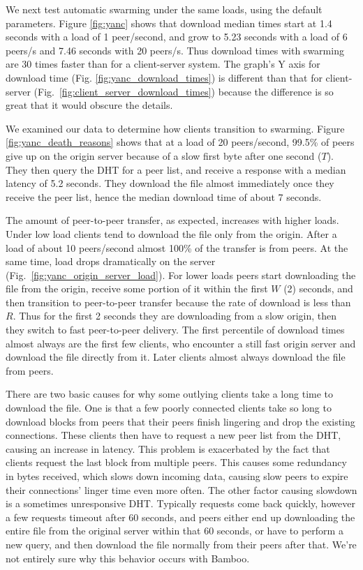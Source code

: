 We next test automatic swarming under the same loads, using the default parameters. Figure \ref{fig:yanc} shows that download median times 
start at 1.4 seconds with a load of 1 peer/second, and grow 
to 5.23 seconds with a load of 6 peers/s and 7.46 seconds with 20 peers/s.  Thus download times with swarming are 
30 times faster than for a client-server system.   
The graph's Y axis for download time (Fig. \ref{fig:yanc_download_times}) 
is different than that for client-server (Fig.~\ref{fig:client_server_download_times}) 
because the difference is so great that it would obscure the details. 

We examined our data to determine how clients transition to swarming.  Figure \ref{fig:yanc_death_reasons} shows that at a load of 20 peers/second, 99.5\% 
of peers give up on the origin server because of a slow first byte after one second ($T$). They then query the 
DHT for a peer list, and receive a response with a median latency of 5.2 seconds.  They download the file almost 
immediately once they receive the peer list, hence the median download time of about 7 seconds. 

The amount of peer-to-peer transfer, as expected, increases with higher loads. Under low load clients tend to download 
the file only from the origin.  After a load of about 10 peers/second almost 100\% of the transfer is from 
peers.  At the same time, load drops dramatically on the server (Fig.~\ref{fig:yanc_origin_server_load}).  For lower loads peers start 
downloading the file from the origin, receive some portion of it within the first $W$ (2) seconds, and then
transition to peer-to-peer transfer because the rate of download is less than $R$.  
Thus for the first 2 seconds they are downloading from a slow origin, then they switch to fast peer-to-peer delivery.
The first percentile of download times almost always are the first few clients, who encounter a still fast origin server and download the file directly from it.
Later clients almost always download the file from peers.

There are two basic causes for why some outlying clients take a long time to download the file.  One is that a few poorly connected clients take so long to download blocks from peers
that their peers finish lingering and drop the existing connections.  These clients then have to request a new 
peer list from the DHT, causing an increase in latency.  This problem is exacerbated by the fact that clients request 
the last block from multiple peers.  This causes 
some redundancy in bytes received, which slows down incoming data, causing slow peers to expire their connections' linger time even more often.
The other factor causing slowdown is a sometimes unresponsive DHT. Typically requests come back quickly, however a few requests timeout after 60 seconds, 
and peers either end up downloading the entire file from the original server within that 60 seconds, or have to perform a new 
query, and then download the file normally from their peers after that.  We're not entirely sure why this behavior occurs with Bamboo.

